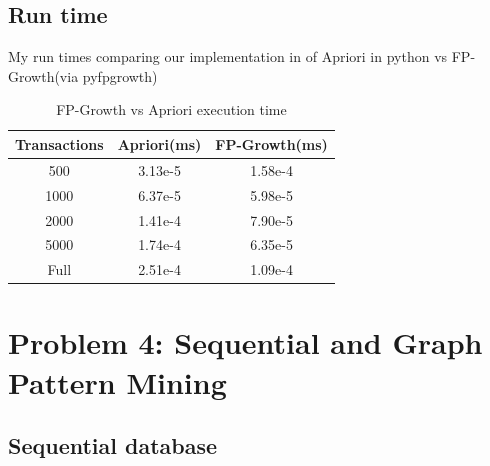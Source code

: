 \documentclass[11pt]{article}
\begin{document}
\subsection{Run time}
My run times comparing our implementation in of Apriori in python vs FP-Growth(via pyfpgrowth)
\begin{table}[]
    \centering
    \begin{tabular}{|c|c|c|} \hline
       Transactions  & Apriori(ms) & FP-Growth(ms)  \\ \hline
       500 & 3.13e-5 & 1.58e-4 \\ \hline 
       1000 & 6.37e-5 & 5.98e-5 \\ \hline 
       2000 & 1.41e-4 & 7.90e-5 \\ \hline 
       5000 & 1.74e-4 & 6.35e-5\\ \hline 
       Full & 2.51e-4 & 1.09e-4 \\ \hline 
    \end{tabular}
    \caption{FP-Growth vs Apriori execution time}
    \label{tab:my_label}
\end{table}
\section{Problem 4: Sequential and Graph Pattern Mining}
\subsection{Sequential database}
\end{document}
